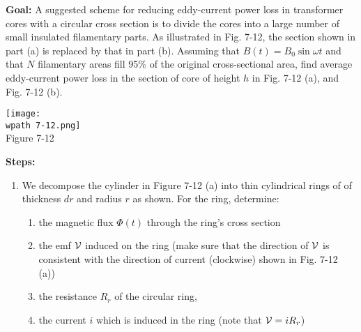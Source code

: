 \documentclass[../../header.tex]{subfiles}
\begin{document}
\textbf{Goal:} A suggested scheme for reducing eddy-current power loss in transformer cores with a circular cross section is to divide the cores into a large number of small insulated filamentary parts. As illustrated in Fig. 7-12, the section shown in part (a) is replaced by that in part (b). Assuming that $B(t) = B_0 \sin \omega t$ and that $N$ filamentary areas fill 95\% of the original cross-sectional area, find average eddy-current power loss in the section of core of height $h$ in Fig. 7-12 (a), and Fig. 7-12 (b).
\begin{center}
\texttt{[image: \\wpath 7-12.png]}\\
Figure 7-12
\end{center}
\textbf{Steps:} 
\begin{enumerate}
\item We decompose the cylinder in Figure 7-12 (a) into thin cylindrical rings of of thickness $dr$ and radius $r$ as shown. For the ring, determine:
\begin{enumerate}
\item the magnetic flux $\Phi(t)$ through the ring's cross section%


\item the emf ${\cal V}$ induced on the ring (make sure that the direction of ${\cal V}$ is consistent with the direction of current  (clockwise) shown in Fig. 7-12 (a))%


\item the resistance $R_r$ of the circular ring,%


\item the current $i$ which is induced in the ring (note that ${\cal V} = i R_r$) %


\end{enumerate}
\end{enumerate}
\end{document}
